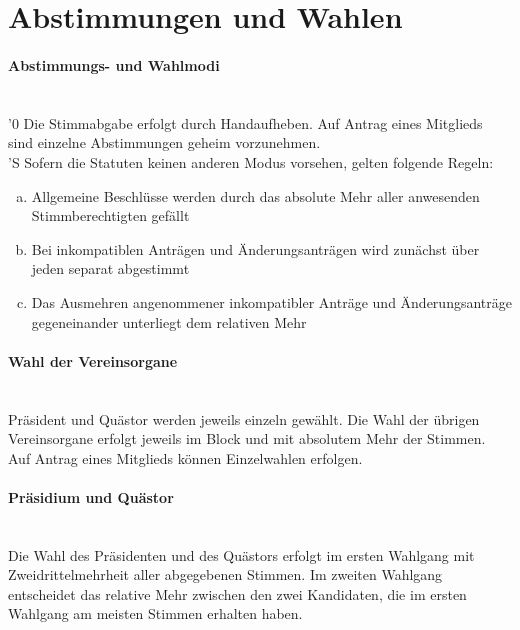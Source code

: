 \documentclass[a4paper,11pt]{article}
\newcommand{\nl}{\\[1.5ex]}
\begin{document}
\section*{Abstimmungen und Wahlen}
\paragraph{Abstimmungs- und Wahlmodi} \ \\
'0 Die Stimmabgabe erfolgt durch Handaufheben. Auf Antrag eines Mitglieds sind einzelne Abstimmungen geheim vorzunehmen. \nl
'S Sofern die Statuten keinen anderen Modus vorsehen, gelten folgende Regeln:
\begin{enumerate}[(a)]
    \item Allgemeine Beschlüsse werden durch das absolute Mehr aller anwesenden Stimmberechtigten gefällt
    \item Bei inkompatiblen Anträgen und Änderungsanträgen wird zunächst über jeden separat abgestimmt
    \item Das Ausmehren angenommener inkompatibler Anträge und Änderungsanträge gegeneinander unterliegt dem relativen Mehr
\end{enumerate}


\paragraph{Wahl der Vereinsorgane} \ \\
Präsident und Quästor werden jeweils einzeln gewählt. Die Wahl der übrigen Vereinsorgane erfolgt jeweils im Block und mit absolutem Mehr der Stimmen. Auf Antrag eines Mitglieds können Einzelwahlen erfolgen.

\paragraph{Präsidium und Quästor} \ \\
Die Wahl des Präsidenten und des Quästors erfolgt im ersten Wahlgang mit Zweidrittelmehrheit aller abgegebenen Stimmen. Im zweiten Wahlgang entscheidet das relative Mehr zwischen den zwei Kandidaten, die im ersten Wahlgang am meisten Stimmen erhalten haben.









\end{document}
